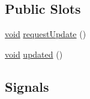 \subsection*{Public Slots}
\begin{DoxyCompactItemize}
\item 
\hyperlink{group___u_a_v_objects_plugin_ga444cf2ff3f0ecbe028adce838d373f5c}{void} \hyperlink{group___u_a_v_objects_plugin_ga6018820b37db308fb1ee1b3c3ff4f9a0}{request\-Update} ()
\item 
\hyperlink{group___u_a_v_objects_plugin_ga444cf2ff3f0ecbe028adce838d373f5c}{void} \hyperlink{group___u_a_v_objects_plugin_ga295ff9d6b0c01a6a8809a4cf9eb027cc}{updated} ()
\end{DoxyCompactItemize}
\subsection*{Signals}
